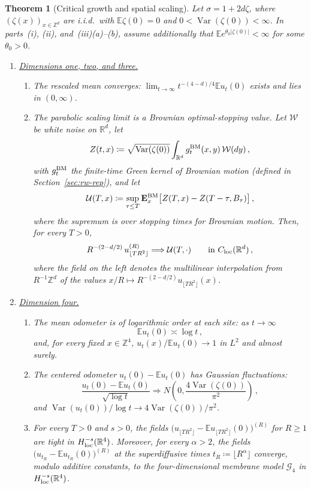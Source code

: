 \documentclass[11pt]{amsart}
\theoremstyle{plain}
\newtheorem{theorem}{Theorem}[section]
\theoremstyle{definition}
\newcommand{\Z}{\mathbb{Z}}
\newcommand{\R}{\mathbb{R}}
\newcommand{\E}{\mathbb{E}}
\DeclareMathOperator{\Var}{Var}
\begin{document}
\begin{theorem}[Critical growth and spatial scaling]\label{thm:main-explosion}
Let $\sigma=1+2d\zeta$, where $(\zeta(x))_{x\in\Z^d}$ are i.i.d.\ with $\E\zeta(0)=0$ and $0<\Var(\zeta(0))<\infty$. In parts~\textup{(i)}, \textup{(ii)}, and~\textup{(iii)(a)--(b)}, assume additionally that
$\E e^{\theta_0|\zeta(0)|}<\infty$ for some $\theta_0>0$.

\begin{enumerate}[label=\textup{(\roman*)}]
\item \underline{\textup{Dimensions one, two, and three.}}
\begin{enumerate}[label=\textup{(\alph*)}]
\item The rescaled mean converges:
$\lim_{t\to\infty}t^{-(4-d)/4}\E u_t(0)$
exists and lies in $(0,\infty)$.
\item The parabolic scaling limit is a Brownian optimal-stopping value. Let
$\mathcal W$ be white noise on $\R^d$, let
\[
    Z(t,x)\coloneqq \sqrt{\Var(\zeta(0))}
    \int_{\R^d}g_t^{\rm BM}(x,y)\,\mathcal W(dy)\, ,
\]
with $g_t^{\rm BM}$ the finite-time Green kernel of Brownian motion (defined in Section~\ref{sec:rw-rep}), and let
\[
    \mathcal U(T,x)\coloneqq
    \sup_{\tau\leq T}\mathbf E_x^{\rm BM}
    \bigl[Z(T,x)-Z(T-\tau,B_\tau)\bigr]\, ,
\]
where the supremum is over stopping times for Brownian motion. Then, for every $T>0$,
\[
    R^{-(2-d/2)}\,u^{(R)}_{\lfloor TR^2\rfloor}
    \Longrightarrow
    \mathcal U(T,\cdot)
    \qquad\text{in }C_{\rm loc}(\R^d)\, ,
\]
where the field on the left denotes the multilinear interpolation from $R^{-1}\Z^d$ of the values
$x/R\mapsto R^{-(2-d/2)}u_{\lfloor TR^2\rfloor}(x)$.
\end{enumerate}

\item \underline{\textup{Dimension four.}}
\begin{enumerate}[label=\textup{(\alph*)}]
\item The mean odometer is of logarithmic order at each site: as $t\to\infty$
\[
    \E u_t(0)\asymp\log t\, ,
\]
and, for every fixed $x\in\Z^4$, $u_t(x)/\E u_t(0)\to1$ in $L^2$ and
almost surely.
\item The centered odometer $u_t(0)-\E u_t(0)$ has Gaussian fluctuations:
\[
    \frac{u_t(0)-\E u_t(0)}{\sqrt{\log t}}
    \Longrightarrow
    N\left(0,\frac{4\Var(\zeta(0))}{\pi^2}\right)\, ,
\]
and $\Var(u_t(0))/\log t\to4\Var(\zeta(0))/\pi^2$.
\item For every $T>0$ and $s>0$, the fields
$\bigl(u_{\lfloor TR^2\rfloor}-\E u_{\lfloor TR^2\rfloor}(0)\bigr)^{(R)}$ for
$R\geq1$ are tight in $H^{-s}_{\rm loc}(\R^4)$. Moreover, for every
$\alpha>2$, the fields $\bigl(u_{t_R}-\E u_{t_R}(0)\bigr)^{(R)}$ at the
superdiffusive times $t_R\coloneqq\lfloor R^\alpha\rfloor$ converge, modulo additive constants, to the four-dimensional membrane model $\mathcal G_4$ in $H^{-s}_{\rm loc}(\R^4)$.
\end{enumerate}


\end{enumerate}
\end{theorem}
\end{document}
